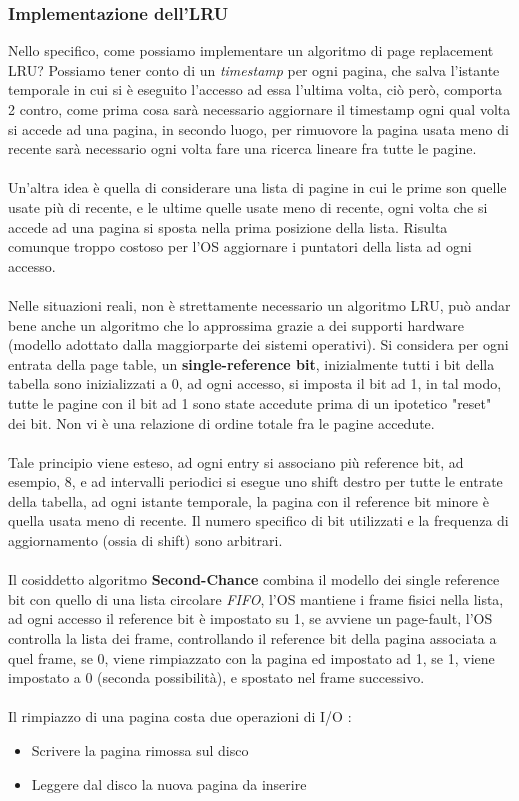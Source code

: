 \documentclass[12pt, letterpaper]{article}
\newcommand{\acc}{\\\hphantom{}\\}
\begin{document}
\subsubsection{Implementazione dell'LRU}
Nello specifico, come possiamo implementare un algoritmo di page replacement LRU? Possiamo tener conto di un 
\textit{timestamp} per ogni pagina, che salva l'istante temporale in cui si è eseguito l'accesso ad essa l'ultima 
volta, ciò però, comporta 2 contro, come prima cosa sarà necessario aggiornare il timestamp ogni qual volta si accede 
ad una pagina, in secondo luogo, per rimuovore la pagina usata meno di recente sarà necessario ogni volta fare 
una ricerca lineare fra tutte le pagine.\acc Un'altra idea è quella di considerare una lista di pagine in cui le prime 
son quelle usate più di recente, e le ultime quelle usate meno di recente, ogni volta che si accede ad una pagina si sposta 
nella prima posizione della lista. Risulta comunque troppo costoso per l'OS aggiornare i puntatori della lista ad ogni 
accesso.\acc 
Nelle situazioni reali, non è strettamente necessario un algoritmo LRU, può andar bene anche un algoritmo che lo 
approssima grazie a dei supporti hardware (modello adottato dalla maggiorparte dei sistemi operativi). Si considera 
per ogni entrata della page table, un \textbf{single-reference bit}, inizialmente tutti i bit della tabella sono 
inizializzati a 0, ad ogni accesso, si imposta il bit ad 1, in tal modo, tutte le pagine con il bit ad 1 sono state accedute 
prima di un ipotetico "reset" dei bit. Non vi è una relazione di ordine totale fra le pagine accedute. \acc 
Tale principio viene esteso, ad ogni entry si associano più reference bit, ad esempio, 8, e ad intervalli periodici 
si esegue uno shift destro per tutte le entrate della tabella, ad ogni istante temporale, la pagina con il 
reference bit minore è quella usata meno di recente. Il numero specifico di bit utilizzati e la frequenza di 
aggiornamento (ossia di shift) sono arbitrari.\acc 
Il cosiddetto algoritmo \textbf{Second-Chance} combina il modello dei single reference bit con quello di una 
lista circolare \textit{FIFO}, l'OS mantiene i frame fisici nella lista, ad ogni accesso il reference bit è 
impostato su 1, se avviene un page-fault, l'OS controlla la lista dei frame, controllando il reference bit della 
pagina associata a quel frame, se 0, viene rimpiazzato con la pagina ed impostato ad 1, se 1, viene impostato 
a 0 (seconda possibilità), e spostato nel frame successivo.\acc 
Il rimpiazzo di una pagina costa due operazioni di I/O : \begin{itemize}
    \item Scrivere la pagina rimossa sul disco 
    \item Leggere dal disco la nuova pagina da inserire 
\end{itemize}
\end{document}
